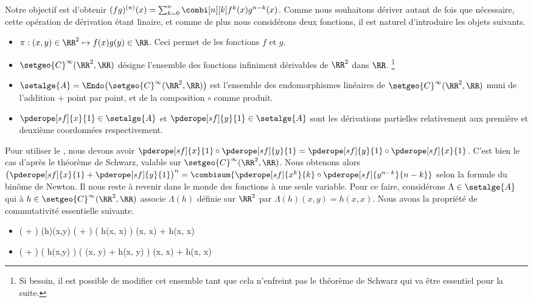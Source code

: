 Notre objectif est d'obtenir
$(fg)^{(n)} (x) = \sum_{k=0}^n \combi[n][k] f^k(x) g^{n-k}(x)$.
%
Comme nous souhaitons dériver autant de fois que nécessaire, cette opération de dérivation étant linaire,
et
comme de plus nous considérons deux fonctions,
il est naturel d'introduire les objets suivants.
%
\begin{itemize}
	\item $\pi: (x,y) \in \RR^2 \mapsto f(x) g(y) \in \RR$. Ceci permet de  les fonctions $f$ et $g$.

	\item $\setgeo{C}^{\infty}(\RR^2 , \RR)$ désigne l'ensemble des fonctions infiniment dérivables de $\RR^2$ dans $\RR$.%
	\footnote{
		Si besoin, il est possible de modifier cet ensemble tant que cela n'enfreint pas le théorème de Schwarz qui va être essentiel pour la suite.
	}

	\item $\setalge{A} = \Endo \big( \setgeo{C}^{\infty}(\RR^2 , \RR) \big)$ est l'ensemble des endomorphismes linéaires de $\setgeo{C}^{\infty}(\RR^2 , \RR)$ muni de l'addition $+$ point par point, et de la composition $\circ$ comme produit.

	\item $\pderope[sf]{x}{1} \in \setalge{A}$ et $\pderope[sf]{y}{1} \in \setalge{A}$ sont les dérivations partielles relativement aux première et deuxième coordonnées respectivement. 
\end{itemize}


Pour utiliser le , nous devons avoir $\pderope[sf]{x}{1} \circ \pderope[sf]{y}{1} = \pderope[sf]{y}{1} \circ \pderope[sf]{x}{1}$. C'est bien le cas d'après le théorème de Schwarz, valable sur $\setgeo{C}^{\infty}(\RR^2 , \RR)$.
%
Nous obtenons alors
$\big( \pderope[sf]{x}{1} + \pderope[sf]{y}{1} \big)^n = \combisum{ \pderope[sf]{x^k}{k} \circ \pderope[sf]{y^{n-k}}{n-k}}$
selon la formule du binôme de Newton.
%
Il nous reste à revenir dans le monde des fonctions à une seule variable. Pour ce faire, considérons $\Lambda \in \setalge{A}$ qui à $h \in \setgeo{C}^{\infty}(\RR^2 , \RR)$ associe $\Lambda(h)$ définie sur $\RR^2$ par $\Lambda(h)(x,y) = h(x, x)$.
%
Nous avons la propriété de commutativité essentielle suivante.
%
\begin{itemize}
	\item
	\begin{stepcalc}[style=sar]
		\big(  +  \big) \circ \Lambda(h)(x,y)
	\explnext{}
		\big(  +  \big) \big( h(x, x) \big)
	\explnext{}
		(x, x) + h(x, x)
	\end{stepcalc}


	\item
	\begin{stepcalc}[style=sar]
		\Lambda \circ \big(  +  \big) \big( h(x,y) \big)
	\explnext{}
		\Lambda \big( (x, y) + h(x, y) \big)
	\explnext{}
		(x, x) + h(x, x)
	\end{stepcalc}
\end{itemize}


